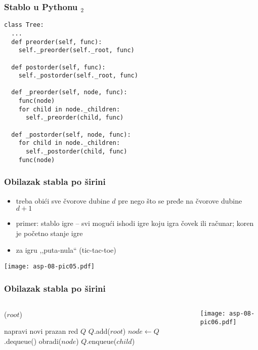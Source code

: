 \documentclass[compress,aspectratio=169]{beamer}
\begin{document}
\begin{frame}
  \frametitle{Stablo u Pythonu $_2$}
\begin{verbatim}
class Tree:
  ...
  def preorder(self, func):
    self._preorder(self._root, func)
    
  def postorder(self, func):
    self._postorder(self._root, func)
    
  def _preorder(self, node, func):
    func(node)
    for child in node._children:
      self._preorder(child, func)
  
  def _postorder(self, node, func):
    for child in node._children:
      self._postorder(child, func)
    func(node)
\end{verbatim}
\end{frame}

\begin{frame}[fragile]
\frametitle{Obilazak stabla po širini}
\begin{itemize}
  \item treba obići sve čvorove dubine $d$ pre nego što se pređe na čvorove dubine $d + 1$
  \item primer: stablo igre -- svi mogući ishodi igre koju igra čovek ili računar; koren je početno stanje igre
  \item za igru ,,puta-nula`` (tic-tac-toe)
\end{itemize}
\begin{center}
  \texttt{[image: asp-08-pic05.pdf]}
\end{center}
\end{frame}

\begin{frame}[fragile]
\frametitle{Obilazak stabla po širini}
\begin{columns}
  \begin{column}[c]{6cm}
    ($root$)
    \begin{algorithmic}
    \STATE napravi novi prazan red $Q$
    \STATE $Q$.add($root$)
      \STATE $node \leftarrow Q$.dequeue()
      \STATE obradi($node$)
        \STATE $Q$.enqueue($child$)
      \ENDFOR  
    \ENDWHILE
    \end{algorithmic}
  \end{column}
  \begin{column}[c]{5cm}
    \begin{center}
      \texttt{[image: asp-08-pic06.pdf]}
    \end{center}
  \end{column}
\end{columns}
\end{frame}
\end{document}

